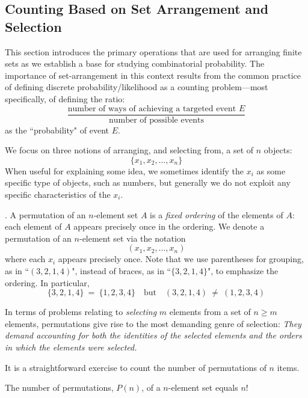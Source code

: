 \subsection{Counting Based on Set Arrangement and Selection}
\label{sec:set-arrangement}

This section introduces the primary operations that are used for arranging finite sets as we
establish a base for studying combinatorial probability.  The importance of set-arrangement
in this context results from the common practice of defining
discrete probability/likelihood as a counting problem---most specifically, of defining the ratio:
\[ 
\frac{\mbox{number of ways of achieving a targeted event $E$}}{\mbox{number of possible events}}
\]
as the ``probability" of event $E$.

\medskip

We focus on three notions of arranging, and selecting from, a set of $n$ objects:
\[ \{ x_1, x_2, \ldots , x_n\} \]
When useful for explaining some idea, we sometimes identify the $x_i$ as some specific type
of objects, such as numbers, but generally we do not exploit any specific
characteristics of the $x_i$.

\medskip

.
A permutation of an $n$-element set $A$ is a {\em fixed ordering} of the elements of $A$:  
each element of $A$ appears precisely once in the ordering.  We denote a permutation
of an $n$-element set via the notation
\[ (x_1,x_2, \ldots , x_n) \]
where each $x_i$ appears precisely once.  Note that we use parentheses for grouping,
as in ``$(3,2,1,4)$", instead of braces, as in ``$\{3,2,1,4\}$", to emphasize the ordering.  In
particular,
\[ \{3,2,1,4\} \ = \ \{1,2,3, 4\} \ \ \ \mbox{ but } \ \ \ (3,2,1,4) \ \neq \ (1, 2, 3,4) \]

\medskip

In terms of problems relating to {\em selecting}
$m$ elements from a set of $n \geq m$ elements, permutations give rise to the most demanding
genre of selection: {\em They demand accounting for both the {\em identities}
of the selected elements and the {\em orders} in which the elements were selected.}

\medskip

It is a straightforward exercise to count the number of permutations of $n$ items.

\begin{prop}
\label{thm:no-permutation}
The number of permutations, $P(n)$, of a $n$-element set equals $n!$
\end{prop}

